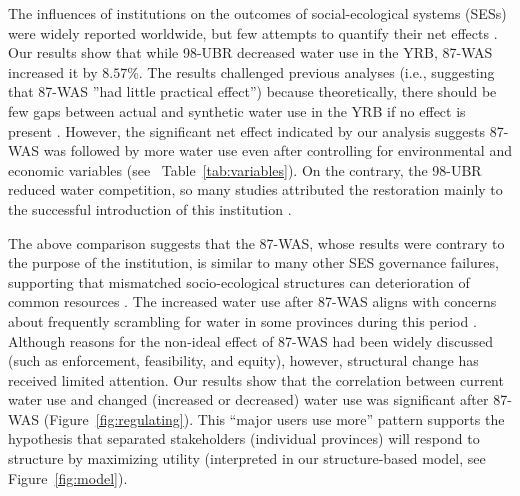 
\label{discussion-1}
The influences of institutions on the outcomes of social-ecological systems (SESs) were widely reported worldwide, but few attempts to quantify their net effects \cite{cumming2020a}.
Our results show that while 98-UBR decreased water use in the YRB, 87-WAS increased it by $8.57\%$.
The results challenged previous analyses (i.e., suggesting that 87-WAS ''had little practical effect'') because theoretically, there should be few gaps between actual and synthetic water use in the YRB if no effect is present \cite{abadie2015,hill2021}.
However, the significant net effect indicated by our analysis suggests 87-WAS was followed by more water use even after controlling for environmental and economic variables (see \textit{}~Table~\ref{tab:variables}).
On the contrary, the 98-UBR reduced water competition, so many studies attributed the restoration mainly to the successful introduction of this institution \cite{chen2021,huangang2002,an2007}.

\label{discussion-2}
The above comparison suggests that the 87-WAS, whose results were contrary to the purpose of the institution, is similar to many other SES governance failures, supporting that mismatched socio-ecological structures can deterioration of common resources \cite{kellenberg2009,cai2016,barnes2019}.
The increased water use after 87-WAS aligns with concerns about frequently scrambling for water in some provinces during this period \cite{mao2000, bouckaert2022}.
Although reasons for the non-ideal effect of 87-WAS had been widely discussed \cite{huangang2002} (such as enforcement, feasibility, and equity), however, structural change has received limited attention.
Our results show that the correlation between current water use and changed (increased or decreased) water use was significant after 87-WAS (Figure~\ref{fig:regulating}).
This ``major users use more'' pattern supports the hypothesis that separated stakeholders (individual provinces) will respond to structure by maximizing utility (interpreted in our structure-based model, see Figure~\ref{fig:model}).

